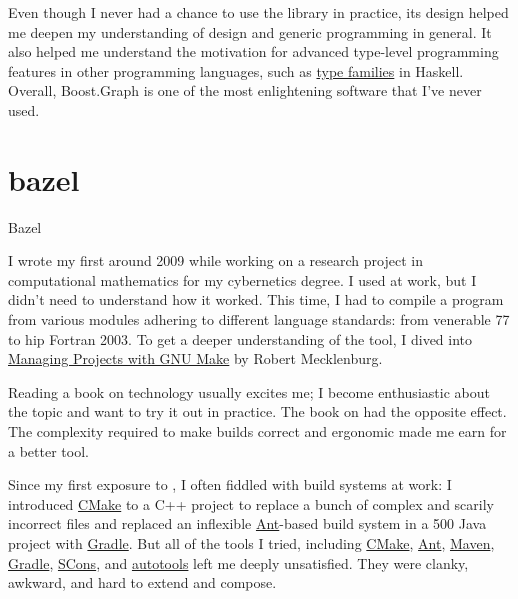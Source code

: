\documentclass{article}
\begin{document}
Even though I never had a chance to use the library in practice, its design helped me deepen my understanding of \href{https://en.wikipedia.org/wiki/Standard_Template_Library}{} design and generic programming in general.
It also helped me understand the motivation for advanced type-level programming features in other programming languages, such as \href{https://wiki.haskell.org/GHC/Type_families}{type families} in Haskell.
Overall, Boost.Graph is one of the most enlightening software that I've never used.

\section{bazel}{Bazel}

I wrote my first  around 2009 while working on a research project in computational mathematics for my cybernetics degree.
I used \href{https://en.wikipedia.org/wiki/Make_(software)}{} at work, but I didn't need to understand how it worked.
This time, I had to compile a  program from various modules adhering to different language standards: from venerable  77 to hip Fortran 2003.
To get a deeper understanding of the tool, I dived into \href{https://www.oreilly.com/library/view/managing-projects-with/0596006101/}{Managing Projects with GNU Make} by Robert Mecklenburg.

Reading a book on technology usually excites me; I become enthusiastic about the topic and want to try it out in practice. 
The book on  had the opposite effect.
The complexity required to make builds correct and ergonomic made me earn for a better tool.

Since my first exposure to , I often fiddled with build systems at work:
I introduced \href{https://cmake.org/}{CMake} to a C++ project to replace a bunch of complex and scarily incorrect  files and
replaced an inflexible \href{https://ant.apache.org/}{Ant}-based build system in a 500  Java project with \href{https://gradle.org/}{Gradle}.
But all of the tools I tried, including \href{https://cmake.org/}{CMake}, \href{https://ant.apache.org/}{Ant}, \href{https://maven.apache.org/}{Maven}, \href{https://gradle.org/}{Gradle}, \href{https://www.scons.org/}{SCons}, and \href{https://www.gnu.org/software/automake/manual/html_node/Autotools-Introduction.html}{autotools} left me deeply unsatisfied.
They were clanky, awkward, and hard to extend and compose.
\end{document}
